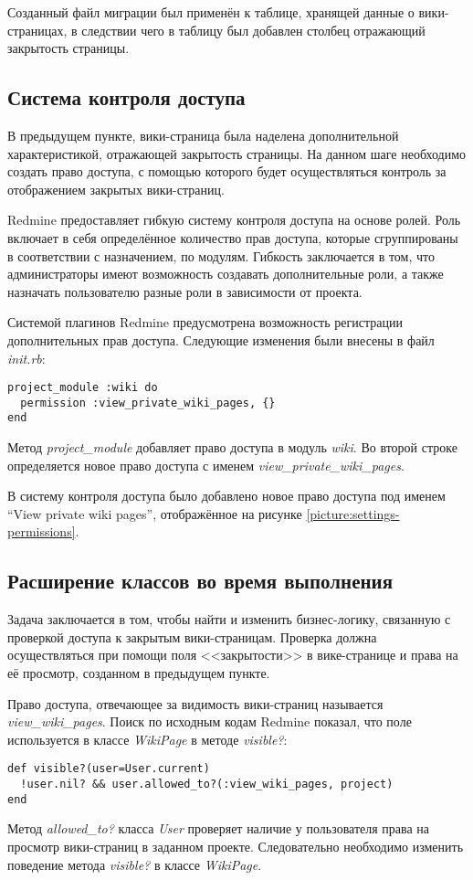 Созданный файл миграции был применён к таблице, хранящей данные
о вики-страницах, в следствии чего в таблицу был добавлен столбец отражающий
закрытость страницы.

\subsection{Система контроля доступа}
\label{section:access_control}
В предыдущем пункте, вики-страница была наделена дополнительной
характеристикой, отражающей закрытость страницы. На данном шаге необходимо
создать право доступа, с помощью которого будет осуществляться контроль за
отображением закрытых вики-страниц.

Redmine предоставляет гибкую систему контроля доступа на основе ролей. Роль
включает в себя определённое количество прав доступа, которые сгруппированы в
соответствии с назначением, по модулям. Гибкость заключается в том, что
администраторы имеют возможность создавать дополнительные роли, а также
назначать пользователю разные роли в зависимости от проекта.

Системой плагинов Redmine предусмотрена возможность регистрации дополнительных
прав доступа. Следующие изменения были внесены в файл \textit{init.rb}:
\small{
\begin{lstlisting}
project_module :wiki do
  permission :view_private_wiki_pages, {}
end
\end{lstlisting}}
Метод \textit{project\_module} добавляет право доступа в модуль \textit{wiki}.
Во второй строке определяется новое право доступа с именем
\textit{view\_private\_wiki\_pages}.


В систему контроля доступа было добавлено новое право доступа под именем ``View
private wiki pages'', отображённое на рисунке
\ref{picture:settings-permissions}.


\subsection{Расширение классов во время выполнения}
\label{section:metaprogramming} 
Задача заключается в том, чтобы найти и изменить бизнес-логику, связанную с
проверкой доступа к закрытым вики-страницам. Проверка должна осуществляться
при помощи поля <<закрытости>> в вике-странице и права на её просмотр,
созданном в предыдущем пункте.

Право доступа, отвечающее за видимость вики-страниц называется
\textit{view\_wiki\_pages}. Поиск по исходным кодам Redmine показал, что поле
используется в классе \textit{WikiPage} в методе \textit{visible?}:
\small{\begin{lstlisting}
def visible?(user=User.current)
  !user.nil? && user.allowed_to?(:view_wiki_pages, project)
end
\end{lstlisting}}
Метод \textit{allowed\_to?} класса \textit{User} проверяет наличие у
пользователя права на просмотр вики-страниц в заданном проекте. Следовательно
необходимо изменить поведение метода \textit{visible?} в классе
\textit{WikiPage}.

